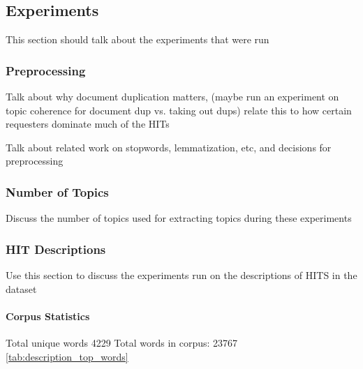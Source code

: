 \documentclass[letterpaper,12pt]{article}
\begin{document}
\subsection{Experiments}
This section should talk about the experiments that were run

\subsubsection{Preprocessing}
Talk about why document duplication matters,
(maybe run an experiment on topic coherence for document dup vs. taking out dups) relate this to
how certain requesters dominate much of the HITs

Talk about related work on stopwords, lemmatization, etc, and decisions for preprocessing

\subsubsection{Number of Topics}
Discuss the number of topics used for extracting topics during these experiments

\subsubsection{HIT Descriptions}
Use this section to discuss the experiments run on the descriptions of HITS in the dataset

\paragraph{Corpus Statistics}
Total unique words 4229
Total words in corpus: 23767
\ref{tab:description_top_words}
\end{document}
